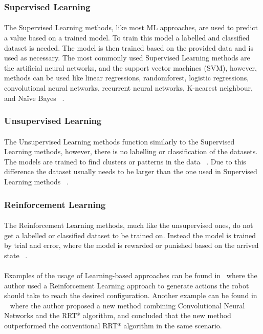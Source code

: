 \subsubsection{Supervised Learning}
\label{subsubsec:SL}
\paragraph{}The Supervised Learning methods, like most ML approaches, are used to predict a value based on a trained model. To train this model
a labelled and classified dataset is needed. The model is then trained based on the provided data and is used as necessary. The most 
commonly used Supervised Learning methods are the artificial neural networks, and the support vector machines (SVM), however, 
methods can be used like linear regressions, randomforest, logistic regressions, convolutional neural networks, recurrent 
neural networks, K-nearest neighbour, and Naïve Bayes ~\cite{MLT1}.
\subsubsection{Unsupervised Learning}
\label{subsubsec:USL}
\paragraph{}The Unsupervised Learning methods function similarly to the Supervised Learning methods, however, 
there is no labelling or classification of the datasets. The models are trained to find clusters or patterns in the data ~\cite{USLT}.
Due to this difference the dataset usually needs to be larger than the one used in Supervised Learning methods ~\cite{MLT1}.
\subsubsection{Reinforcement Learning}
\label{subsubsec:RL}
\paragraph{}The Reinforcement Learning methods, much like the unsupervised ones, do not get a labelled or classified dataset to be trained 
on. Instead the model is trained by trial and error, where the model is rewarded or punished based on the arrived state ~\cite{RLT}.

\paragraph{}Examples of the usage of Learning-based approaches can be found in~\cite{RLEX1} where the author used a Reinforcement 
Learning approach to generate actions the robot should take to reach the desired configuration. Another example can be found in 
~\cite{MLEX2} where the author proposed a new method combining Convolutional Neural Networks and the RRT* algorithm, and concluded
 that the new method outperformed the conventional RRT* algorithm in the same scenario.

